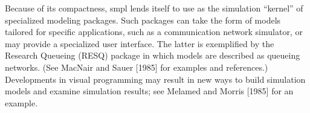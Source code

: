 Because of its compactness, smpl lends itself to use as the simulation
``kernel'' of specialized modeling packages. Such packages can take the form
of models tailored for specific applications, such as a communication network
simulator, or may provide a specialized user interface. The latter is exemplified
by the Research Queueing (RESQ) package in which models are
described as queueing networks. (See MacNair and Sauer [1985] for examples
and references.) Developments in visual programming may result in new
ways to build simulation models and examine simulation results; see
Melamed and Morris [1985] for an example.
